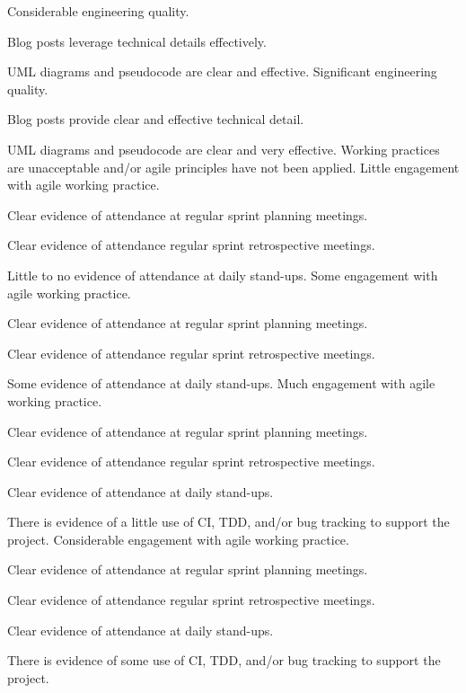 \documentclass{../../fal_assignment}
\begin{document}
\begin{markingrubric}
        \grade Considerable engineering quality.
            \par Blog posts leverage technical details effectively.
            \par UML diagrams and pseudocode are clear and effective.
        \grade Significant engineering quality.
            \par Blog posts provide clear and effective technical detail.
            \par UML diagrams and pseudocode are clear and very effective.        
%
        \grade\fail Working practices are unacceptable and/or agile principles have not been applied.
        \grade Little engagement with agile working practice.
            \par Clear evidence of attendance at regular sprint planning meetings.
            \par Clear evidence of attendance regular sprint retrospective meetings.
            \par Little to no evidence of attendance at daily stand-ups.
        \grade Some engagement with agile working practice.
            \par Clear evidence of attendance at regular sprint planning meetings.
            \par Clear evidence of attendance regular sprint retrospective meetings.
            \par Some evidence of attendance at daily stand-ups.
        \grade Much engagement with agile working practice.
            \par Clear evidence of attendance at regular sprint planning meetings.
            \par Clear evidence of attendance regular sprint retrospective meetings.
            \par Clear evidence of attendance at daily stand-ups.
            \par There is evidence of a little use of CI, TDD, and/or bug tracking to support the project.
        \grade Considerable engagement with agile working practice.
            \par Clear evidence of attendance at regular sprint planning meetings.
            \par Clear evidence of attendance regular sprint retrospective meetings.
            \par Clear evidence of attendance at daily stand-ups.
            \par There is evidence of some use of CI, TDD, and/or bug tracking to support the project.

\end{markingrubric}
\end{document}
